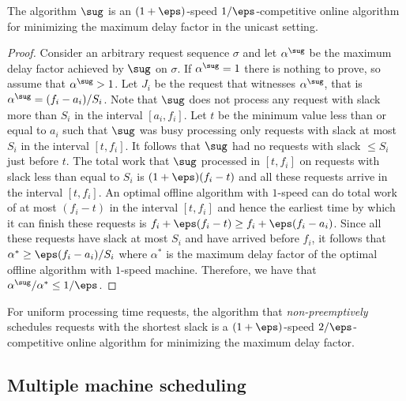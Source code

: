 \begin{theorem}
\label{thm:ssf-single-machine} The algorithm $\sug$ is an $(1 +
\eps)$-speed ${1/\eps}$-competitive online algorithm for minimizing the maximum delay factor in the unicast setting.
\end{theorem}
\begin{proof}
  Consider an arbitrary request sequence $\sigma$ and let $\alpha^\sug$ be
  the maximum delay factor achieved by $\sug$ on $\sigma$. If $\alpha^\sug
  = 1$ there is nothing to prove, so assume that $\alpha^\sug > 1$.  Let
  $J_i$ be the request that witnesses $\alpha^\sug$, that is $\alpha^\sug = (f_i
  - a_i)/S_i$. Note that $\sug$ does not process any request with slack
  more than $S_i$ in the interval $[a_i, f_i]$. Let $t$ be the minimum
  value less than or equal to $a_i$ such that $\sug$ was busy processing only
  requests with slack at most $S_i$ in the interval $[t, f_i]$. It
  follows that $\sug$ had no requests with slack $\le S_i$ just before
  $t$. The total work that $\sug$ processed in $[t,f_i]$ on requests
  with slack less than equal to $S_i$ is $(1+\eps)(f_i-t)$ and all
  these requests arrive in the interval $[t,f_i]$. An optimal offline
  algorithm with $1$-speed can do total work of at most $(f_i-t)$ in
  the interval $[t,f_i]$ and hence the earliest time by which it can
  finish these requests is $f_i + \eps (f_i-t) \ge f_i + \eps(f_i -
  a_i)$. Since all these requests have slack at most $S_i$ and have
  arrived before $f_i$, it follows that $\alpha^* \ge \eps(f_i -
  a_i)/S_i$ where $\alpha^*$ is the maximum delay factor of the
  optimal offline algorithm with $1$-speed machine. Therefore, we have
  that $\alpha^{\sug}/\alpha^* \le 1/\eps$.
\end{proof}

\begin{remark}
  For uniform processing time requests, the algorithm that \emph{non-preemptively} schedules requests with the shortest slack is a
  $(1+\eps)$-speed $2/\eps$-competitive online  algorithm for
  minimizing the maximum delay factor.
\end{remark}

\subsection{Multiple machine scheduling}
\label{unicast-multi}

